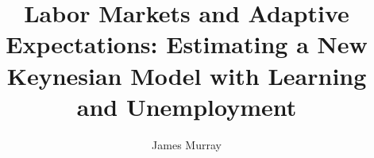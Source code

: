 \documentclass[11pt]{article}
\begin{document}
\setcounter{page}{1}

\title{Labor Markets and Adaptive Expectations: Estimating a New Keynesian Model with Learning and Unemployment}
\author{James Murray}

\begin{comment}
\maketitle
\abstract{The purpose of this research project is to investigate the effect adaptive expectations can have on unemployment.  One of the primary purposes of the literature in applied macroeconometrics is to formulate mathematical models of countries' economies, then estimate these models to uncover causes for business cycle fluctuations, which includes recessions, expansions, price inflation, and changes in aggregate employment.  The most popular modeling strategy is to set up a framework for consumer decisions, business decisions, and economic policy where all economic agents (consumers, businesses, and policy makers) have rational expectations.  Expectations can crucially determine the path a country's economy takes; low confidence on its own can bring about an economic downturn.  As important as expectations can be, the rational expectations assumption does not allow for expectations to have negative effects on the economy.  Instead, it assumes agents fully understand the functioning of the economy, and it allows agents to optimally respond to economic shocks, thus mitigating the effects economic shocks have on the business cycle.  I will instead contribute to a literature on adaptive expectations which allows for expectations to cause and/or exacerbate business cycle fluctuations.  The second most popular assumption in the macroeconometrics literature is to assume unemployment does not exist, because modeling labor markets away from equilibrium brings up another modeling complication.  Until only very recently, the macroeconometrics literature has not attempted to explain unemployment cycles along with business cycles.  The purpose of this paper is to build on this new unemployment literature by estimating how important expectations have been in creating unemployment episodes in recent U.S. history.}
\end{comment}
\end{document}
